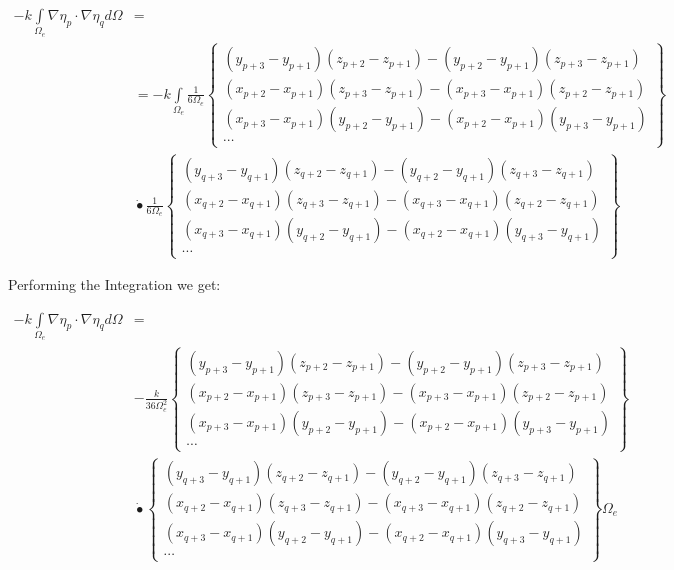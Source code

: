 \documentclass[12pt]{article}
\begin{document}
\begin{align*}
 -k\int\limits_{\Omega_e} \nabla \eta_p \cdot \nabla \eta_q d\Omega &= \\ 
 &= -k\int\limits_{\Omega_e} \frac{1}{6\Omega_e} 
 \begin{Bmatrix} 
 (y_{p+3}-y_{p+1})(z_{p+2}-z_{p+1})-(y_{p+2}-y_{p+1})(z_{p+3}-z_{p+1}) \\
 (x_{p+2}-x_{p+1})(z_{p+3}-z_{p+1})-(x_{p+3}-x_{p+1})(z_{p+2}-z_{p+1}) \\
 (x_{p+3}-x_{p+1})(y_{p+2}-y_{p+1})-(x_{p+2}-x_{p+1})(y_{p+3}-y_{p+1}) \\
 \cdots
 \end{Bmatrix} \\
 &\dot{•} 
 \frac{1}{6\Omega_e} 
 \begin{Bmatrix} 
 (y_{q+3}-y_{q+1})(z_{q+2}-z_{q+1})-(y_{q+2}-y_{q+1})(z_{q+3}-z_{q+1}) \\
 (x_{q+2}-x_{q+1})(z_{q+3}-z_{q+1})-(x_{q+3}-x_{q+1})(z_{q+2}-z_{q+1}) \\
 (x_{q+3}-x_{q+1})(y_{q+2}-y_{q+1})-(x_{q+2}-x_{q+1})(y_{q+3}-y_{q+1}) \\
 \cdots
 \end{Bmatrix}
\end{align*}

Performing the Integration we get:

\begin{equation}
\begin{aligned}
-k\int\limits_{\Omega_e} \nabla \eta_p \cdot \nabla \eta_q d\Omega &= \\
 & -\frac{k}{36\Omega_e^2} 
 \begin{Bmatrix} 
 (y_{p+3}-y_{p+1})(z_{p+2}-z_{p+1})-(y_{p+2}-y_{p+1})(z_{p+3}-z_{p+1}) \\
 (x_{p+2}-x_{p+1})(z_{p+3}-z_{p+1})-(x_{p+3}-x_{p+1})(z_{p+2}-z_{p+1}) \\
 (x_{p+3}-x_{p+1})(y_{p+2}-y_{p+1})-(x_{p+2}-x_{p+1})(y_{p+3}-y_{p+1}) \\
 \cdots
 \end{Bmatrix} \\
 &\dot{•} 
 \begin{Bmatrix} 
 (y_{q+3}-y_{q+1})(z_{q+2}-z_{q+1})-(y_{q+2}-y_{q+1})(z_{q+3}-z_{q+1}) \\
 (x_{q+2}-x_{q+1})(z_{q+3}-z_{q+1})-(x_{q+3}-x_{q+1})(z_{q+2}-z_{q+1}) \\
 (x_{q+3}-x_{q+1})(y_{q+2}-y_{q+1})-(x_{q+2}-x_{q+1})(y_{q+3}-y_{q+1}) \\
 \cdots
 \end{Bmatrix} {\Omega_e}
\end{aligned}
\end{equation}
\end{document}
